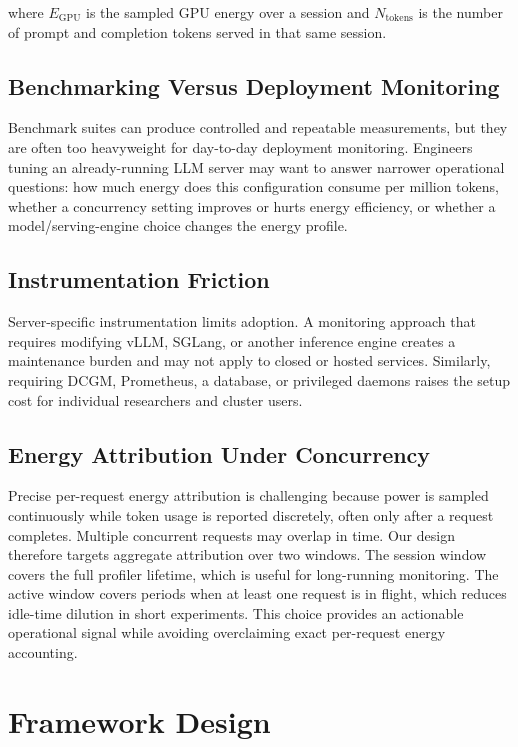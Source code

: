 \documentclass[conference]{IEEEtran}
\begin{document}
where \(E_{\mathrm{GPU}}\) is the sampled GPU energy over a session and \(N_{\mathrm{tokens}}\) is the number of prompt and completion tokens served in that same session.

\subsection{Benchmarking Versus Deployment Monitoring}

Benchmark suites can produce controlled and repeatable measurements, but they are often too heavyweight for day-to-day deployment monitoring. Engineers tuning an already-running LLM server may want to answer narrower operational questions: how much energy does this configuration consume per million tokens, whether a concurrency setting improves or hurts energy efficiency, or whether a model/serving-engine choice changes the energy profile.

\subsection{Instrumentation Friction}

Server-specific instrumentation limits adoption. A monitoring approach that requires modifying vLLM, SGLang, or another inference engine creates a maintenance burden and may not apply to closed or hosted services. Similarly, requiring DCGM, Prometheus, a database, or privileged daemons raises the setup cost for individual researchers and cluster users.

\subsection{Energy Attribution Under Concurrency}

Precise per-request energy attribution is challenging because power is sampled continuously while token usage is reported discretely, often only after a request completes. Multiple concurrent requests may overlap in time. Our design therefore targets aggregate attribution over two windows. The session window covers the full profiler lifetime, which is useful for long-running monitoring. The active window covers periods when at least one request is in flight, which reduces idle-time dilution in short experiments. This choice provides an actionable operational signal while avoiding overclaiming exact per-request energy accounting.

\section{Framework Design}
\end{document}

